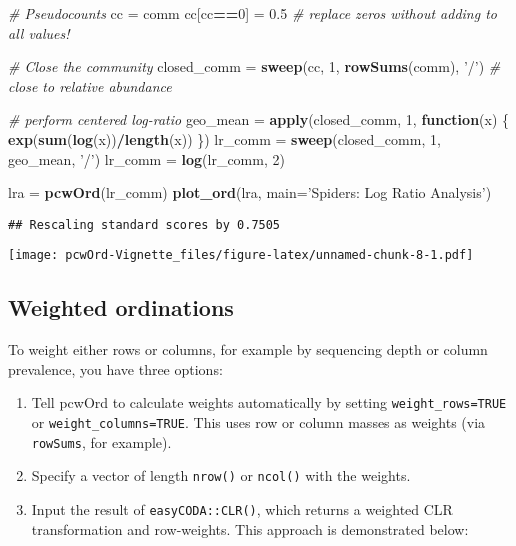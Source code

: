 \documentclass[
]{article}
\newenvironment{Shaded}{\begin{snugshade}}{\end{snugshade}}
\newcommand{\CommentTok}[1]{\textcolor[rgb]{0.56,0.35,0.01}{\textit{#1}}}
\newcommand{\ControlFlowTok}[1]{\textcolor[rgb]{0.13,0.29,0.53}{\textbf{#1}}}
\newcommand{\DataTypeTok}[1]{\textcolor[rgb]{0.13,0.29,0.53}{#1}}
\newcommand{\DecValTok}[1]{\textcolor[rgb]{0.00,0.00,0.81}{#1}}
\newcommand{\FloatTok}[1]{\textcolor[rgb]{0.00,0.00,0.81}{#1}}
\newcommand{\KeywordTok}[1]{\textcolor[rgb]{0.13,0.29,0.53}{\textbf{#1}}}
\newcommand{\NormalTok}[1]{#1}
\newcommand{\OperatorTok}[1]{\textcolor[rgb]{0.81,0.36,0.00}{\textbf{#1}}}
\newcommand{\StringTok}[1]{\textcolor[rgb]{0.31,0.60,0.02}{#1}}
\providecommand{\tightlist}{%
  \setlength{\itemsep}{0pt}\setlength{\parskip}{0pt}}
\begin{document}
\begin{Shaded}
\begin{Highlighting}[]
\CommentTok{# Pseudocounts}
\NormalTok{cc =}\StringTok{ }\NormalTok{comm}
\NormalTok{cc[cc}\OperatorTok{==}\DecValTok{0}\NormalTok{] =}\StringTok{ }\FloatTok{0.5} \CommentTok{# replace zeros without adding to all values!}

\CommentTok{# Close the community}
\NormalTok{closed_comm =}\StringTok{ }\KeywordTok{sweep}\NormalTok{(cc, }\DecValTok{1}\NormalTok{, }\KeywordTok{rowSums}\NormalTok{(comm), }\StringTok{'/'}\NormalTok{) }\CommentTok{# close to relative abundance}

\CommentTok{# perform centered log-ratio}
\NormalTok{geo_mean =}\StringTok{ }\KeywordTok{apply}\NormalTok{(closed_comm, }\DecValTok{1}\NormalTok{, }
                 \ControlFlowTok{function}\NormalTok{(x) \{}
                   \KeywordTok{exp}\NormalTok{(}\KeywordTok{sum}\NormalTok{(}\KeywordTok{log}\NormalTok{(x))}\OperatorTok{/}\KeywordTok{length}\NormalTok{(x))}
\NormalTok{                 \})}
\NormalTok{lr_comm =}\StringTok{  }\KeywordTok{sweep}\NormalTok{(closed_comm, }\DecValTok{1}\NormalTok{, geo_mean, }\StringTok{'/'}\NormalTok{)}
\NormalTok{lr_comm =}\StringTok{ }\KeywordTok{log}\NormalTok{(lr_comm, }\DecValTok{2}\NormalTok{)}

\NormalTok{lra =}\StringTok{ }\KeywordTok{pcwOrd}\NormalTok{(lr_comm)}
\KeywordTok{plot_ord}\NormalTok{(lra, }
         \DataTypeTok{main=}\StringTok{'Spiders: Log Ratio Analysis'}\NormalTok{)}
\end{Highlighting}
\end{Shaded}

\begin{verbatim}
## Rescaling standard scores by 0.7505
\end{verbatim}

\texttt{[image: pcwOrd-Vignette\_files/figure-latex/unnamed-chunk-8-1.pdf]}

\hypertarget{weighted-ordinations}{%
\subsection{Weighted ordinations}\label{weighted-ordinations}}

To weight either rows or columns, for example by sequencing depth or
column prevalence, you have three options:

\begin{enumerate}
\def\labelenumi{\arabic{enumi}.}
\tightlist
\item
  Tell pcwOrd to calculate weights automatically by setting
  \texttt{weight\_rows=TRUE} or \texttt{weight\_columns=TRUE}. This uses
  row or column masses as weights (via \texttt{rowSums}, for example).
\item
  Specify a vector of length \texttt{nrow()} or \texttt{ncol()} with the
  weights.
\item
  Input the result of \texttt{easyCODA::CLR()}, which returns a weighted
  CLR transformation and row-weights. This approach is demonstrated
  below:
\end{enumerate}
\end{document}
